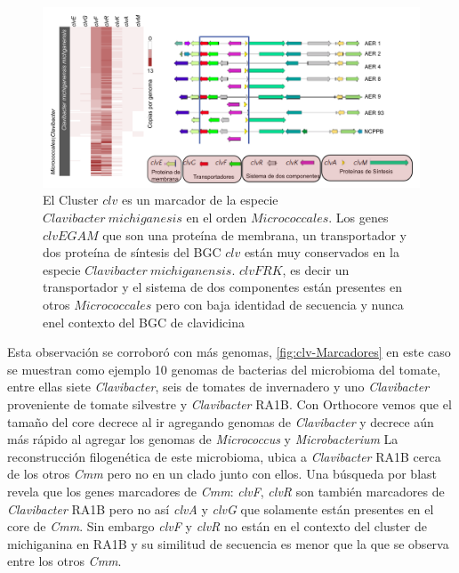 \documentclass[12pt,twoside]{reedthesis}
\begin{document}
  \begin{figure}[h!tbp]
  \centering
  \includegraphics[angle = 0,scale = .6]{chapter1/clv.png}
  \caption[ El Cluster $clv$ es un marcador de la especie $Clavibacter~michiganesis$ en el orden $Micrococcales$.]{\footnotesize{El Cluster $clv$ es un marcador de la especie $Clavibacter~michiganesis$ en el orden $Micrococcales$. Los genes $clvEGAM$ que son una proteína de membrana, un transportador y dos proteína de síntesis del BGC $clv$ están muy conservados en la especie $Clavibacter~michiganensis$. $clvFRK$, es decir un transportador y el sistema de dos componentes están presentes en otros $Micrococcales$ pero con baja identidad de secuencia y nunca enel contexto del BGC de clavidicina}}
  \label{fig:clv-Marcadores}
  \end{figure}
  
  Esta observación se corroboró con más genomas,
  \autoref{fig:clv-Marcadores} en este caso se muestran como ejemplo 10
  genomas de bacterias del microbioma del tomate, entre ellas siete
  \emph{Clavibacter}, seis de tomates de invernadero y uno
  \emph{Clavibacter} proveniente de tomate silvestre y \emph{Clavibacter}
  RA1B. Con Orthocore vemos que el tamaño del core decrece al ir agregando
  genomas de \emph{Clavibacter} y decrece aún más rápido al agregar los
  genomas de \emph{Micrococcus} y \emph{Microbacterium} La reconstrucción
  filogenética de este microbioma, ubica a \emph{Clavibacter} RA1B cerca
  de los otros \emph{Cmm} pero no en un clado junto con ellos. Una
  búsqueda por blast revela que los genes marcadores de \emph{Cmm}:
  \emph{clvF}, \emph{clvR} son también marcadores de \emph{Clavibacter}
  RA1B pero no así \emph{clvA} y \emph{clvG} que solamente están presentes
  en el core de \emph{Cmm}. Sin embargo \emph{clvF} y \emph{clvR} no están
  en el contexto del cluster de michiganina en RA1B y su similitud de
  secuencia es menor que la que se observa entre los otros \emph{Cmm}.
  
\end{document}
